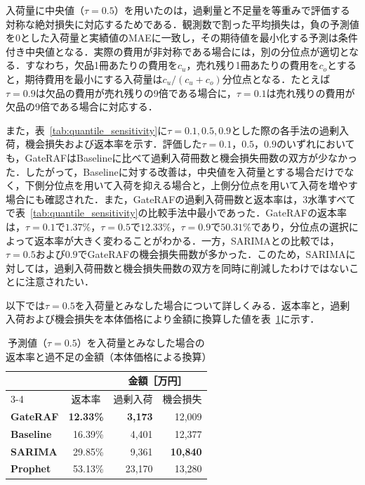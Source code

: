 \documentclass[twocolumn, lastpage]{jarticle}
\newif\ifrevmark
\newcommand{\revA}[1]{\ifrevmark{\color{blue}#1}\else#1\fi}
\newcommand{\revB}[1]{\ifrevmark{\color{red}#1}\else#1\fi}
\newcommand{\revAcolor}{\ifrevmark\color{blue}\fi}
\newcommand{\revBblock}[1]{\ifrevmark{\color{red}#1}\else#1\fi}
\begin{document}
\revBblock{
入荷量に中央値（$\tau=0.5$）を用いたのは，過剰量と不足量を等重みで評価する対称な絶対損失に対応するためである．観測数で割った平均損失は，負の予測値を$0$とした入荷量と実績値のMAEに一致し，その期待値を最小化する予測は条件付き中央値となる．実際の費用が非対称である場合には，別の分位点が適切となる．すなわち，欠品1冊あたりの費用を$c_u$，売れ残り1冊あたりの費用を$c_o$とすると，期待費用を最小にする入荷量は$c_u/(c_u+c_o)$分位点となる．たとえば$\tau=0.9$は欠品の費用が売れ残りの9倍である場合に，$\tau=0.1$は売れ残りの費用が欠品の9倍である場合に対応する．

また，表~\ref{tab:quantile_sensitivity}に$\tau=0.1, 0.5, 0.9$とした際の各手法の過剰入荷，機会損失および返本率を示す．評価した$\tau=0.1$，$0.5$，$0.9$のいずれにおいても，GateRAFはBaselineに比べて過剰入荷冊数と機会損失冊数の双方が少なかった．したがって，Baselineに対する改善は，中央値を入荷量とする場合だけでなく，下側分位点を用いて入荷を抑える場合と，上側分位点を用いて入荷を増やす場合にも確認された．また，GateRAFの過剰入荷冊数と返本率は，3水準すべてで表~\ref{tab:quantile_sensitivity}の比較手法中最小であった．GateRAFの返本率は，$\tau=0.1$で$1.37\%$，$\tau=0.5$で$12.33\%$，$\tau=0.9$で$50.31\%$であり，分位点の選択によって返本率が大きく変わることがわかる．一方，SARIMAとの比較では，$\tau=0.5$および$0.9$でGateRAFの機会損失冊数が多かった．このため，SARIMAに対しては，過剰入荷冊数と機会損失冊数の双方を同時に削減したわけではないことに注意されたい．
}

以下では$\tau=0.5$を入荷量とみなした場合について詳しくみる．返本率と，\revA{過剰入荷および機会損失を本体価格により金額に換算した値}を表~\ref{tab:return_loss}に示す．
    \begin{table}[t]
        \caption{予測値\revB{（$\tau=0.5$）}を入荷量とみなした場合の返本率\revAcolor と過不足の金額（本体価格による換算）}
        \label{tab:return_loss}
        \centering
        \setlength{\tabcolsep}{6pt}%
        \begin{tabular}{lrrr}
            \hline
            & & \multicolumn{2}{c}{\revAcolor 金額［万円］} \\
            \cline{3-4}
            \multicolumn{1}{c}{モデル} & \multicolumn{1}{c}{返本率} & \multicolumn{1}{c}{\revAcolor 過剰入荷} & \multicolumn{1}{c}{\revAcolor 機会損失} \\
            \hline\hline
            \textbf{GateRAF} & \textbf{12.33\%} & \revAcolor\textbf{3{,}173} & \revAcolor 12{,}009 \\
            \textbf{Baseline} & 16.39\% & \revAcolor 4{,}401 & \revAcolor 12{,}377 \\
            \textbf{SARIMA} & 29.85\% & \revAcolor 9{,}361 & \revAcolor\textbf{10{,}840} \\
            \textbf{Prophet} & 53.13\% & \revAcolor 23{,}170 & \revAcolor 13{,}280 \\
            \hline
        \end{tabular}
    \end{table}
\end{document}
